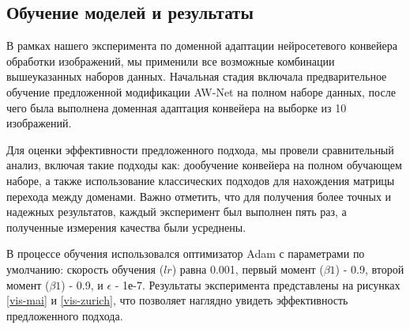 \subsection{Обучение моделей и результаты}\label{sect-5-3}

В рамках нашего эксперимента по доменной адаптации нейросетевого конвейера обработки изображений, мы применили все возможные комбинации вышеуказанных наборов данных. Начальная стадия включала предварительное обучение предложенной модификации AW-Net на полном наборе данных, после чего была выполнена доменная адаптация конвейера на выборке из 10 изображений.

Для оценки эффективности предложенного подхода, мы провели сравнительный анализ, включая такие подходы как: дообучение конвейера на полном обучающем наборе, а также использование классических подходов для нахождения матрицы перехода между доменами. Важно отметить, что для получения более точных и надежных результатов, каждый эксперимент был выполнен пять раз, а полученные измерения качества были усреднены.

В процессе обучения использовался оптимизатор Adam с параметрами по умолчанию: скорость обучения ($lr$) равна 0.001, первый момент ($\beta1$) - 0.9, второй момент ($\beta1$) - 0.9, и $\epsilon$ - 1е-7. Результаты эксперимента представлены на рисунках \ref{vis-mai} и \ref{vis-zurich}, что позволяет наглядно увидеть эффективность предложенного подхода.




